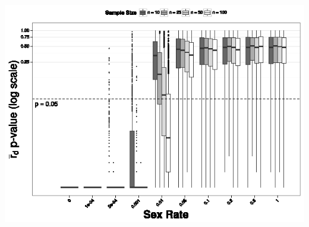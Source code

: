 \documentclass[letterpaper, 10pt]{article}
\begin{document}
\begin{center}
\includegraphics{figures/rbarD_pval2.eps}\\
\end{center}
\end{document}
